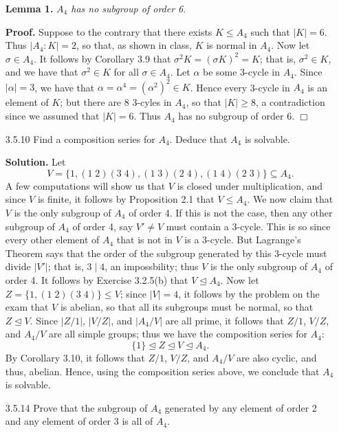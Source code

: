 \documentclass[9pt]{article}
\newcommand{\qed}{\hfill \ensuremath{\Box}}
\begin{document}
\begin{enumerate}
   \item[\textbf{Lemma 1.}] \textit{$A_4$ has no subgroup of order 6}.
   
   \textbf{Proof.} Suppose to the contrary that there exists $K \le A_4$ such 
   that $|K| = 6$. Thus $|A_4 : K| = 2$, so that, as shown in class, $K$ is 
   normal in $A_4$. Now let $\sigma \in A_4$. It follows by Corollary 3.9 that
   $\sigma^2K = (\sigma K)^2 = K$; that is, $\sigma^2 \in K$, and we have that
   $\sigma^2 \in K$ for all $\sigma \in A_4$. Let $\alpha$ be some 3-cycle in
   $A_4$. Since $|\alpha| = 3$, we have that
   $\alpha = \alpha^4 = (\alpha^2)^2 \in K$. Hence every 3-cycle in $A_4$ is
   an element of $K$; but there are 8 3-cyles in $A_4$, so that $|K| \ge 8$,
   a contradiction since we assumed that $|K| = 6$. Thus $A_4$ has no subgroup
   of order 6. \qed
   \item[3.5.10]  Find a composition series for $A_4$. Deduce that $A_4$ is
                  solvable.
                  
      \textbf{Solution.} Let
      $$V = \{1, (1\;2)(3\;4), (1\;3)(2\;4), (1\;4)(2\;3)\} \subseteq A_4.$$
      A few computations will show us that $V$ is closed under multiplication,
      and since $V$ is finite, it follows by Proposition 2.1 that $V \le A_4$.
      We now claim that $V$ is the only subgroup of $A_4$ of order 4. If this is
      not the case, then any other subgroup of $A_4$ of order 4, say $V' \neq V$
      must contain a 3-cycle. This is so since every other element of $A_4$ that
      is not in $V$ is a 3-cycle. But Lagrange's Theorem says that the order of
      the subgroup generated by this 3-cycle must divide $|V'|$; that is,
      $3 \mid 4$, an impossbility; thus $V$ is the only subgroup of $A_4$ of 
      order 4. It follows by Exercise 3.2.5(b) that $V \trianglelefteq A_4$. Now 
      let $Z = \{1, (1\;2)(3\;4)\} \le V$; since $|V| = 4$, it follows by the
      problem on the exam that $V$ is abelian, so that all its subgroups must be
      normal, so that $Z \trianglelefteq V$. Since $|Z/{1}|$, $|V/Z|$, and
      $|A_4/V|$ are all prime, it follows that $Z/{1}$, $V/Z$, and $A_4/V$ are
      all simple groups; thus we have the composition series for $A_4$:
      $$\{1\} \trianglelefteq Z \trianglelefteq V \trianglelefteq A_4.$$
      By Corollary 3.10, it follows that $Z/{1}$, $V/Z$, and $A_4/V$ are also
      cyclic, and thus, abelian. Hence, using the composition series above, we
      conclude that $A_4$ is solvable.
   \item[3.5.14]  Prove that the subgroup of $A_4$ generated by any element of
                  order 2 and any element of order 3 is all of $A_4$.
                  

\end{enumerate}
\end{document}
